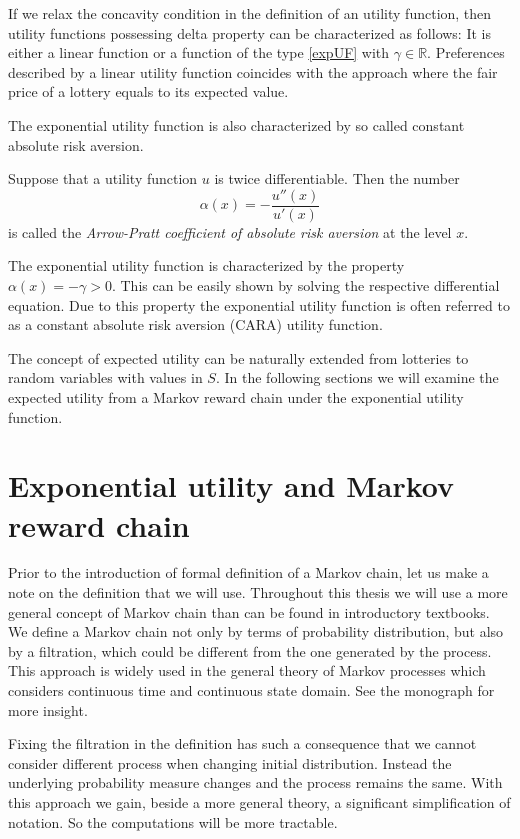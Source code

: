 If we relax the concavity condition in the definition of an utility function, then utility functions possessing delta property can be characterized as follows: It is either a linear function or a function of the type \eqref{expUF} with $\gamma\in\mathbb{R}$. Preferences described by a linear utility function coincides with the approach where the fair price of a lottery equals to its expected value.

The exponential utility function is also characterized by so called constant absolute risk aversion.
\begin{df}Suppose that a utility function $u$ is twice differentiable. Then the number
\[\alpha(x)=-\frac{u''(x)}{u'(x)}\]
is called the {\em Arrow-Pratt coefficient of absolute risk aversion} at the level $x$.
\end{df}
\noindent The exponential utility function is characterized by the property $\alpha(x)=-\gamma>0$. This can be easily shown by solving the respective differential equation. Due to this property the exponential utility function is often referred to as a constant absolute risk aversion (CARA) utility function.

The concept of expected utility can be naturally extended from lotteries to random variables with values in $S$. In the following sections we will examine the expected utility from a Markov reward chain under the exponential utility function.
\vspace{4 mm}
\section{Exponential utility and Markov reward chain}
\vspace{2 mm}

Prior to the introduction of formal definition of a Markov chain, let us make a note on the definition that we will use. Throughout this thesis we will use a more general concept of Markov chain than can be found in introductory textbooks. We define a Markov chain not only by terms of probability distribution, but also by a filtration, which could be different from the one generated by the process. This approach is widely used in the general theory of Markov processes which considers continuous time and continuous state domain. See the monograph \cite{MP} for more insight. 

Fixing the filtration in the definition has such a consequence that we cannot consider different process when changing initial distribution. Instead the underlying probability measure changes and the process remains the same. With this approach we gain, beside a more general theory, a significant simplification of notation. So the computations will be more tractable. %

